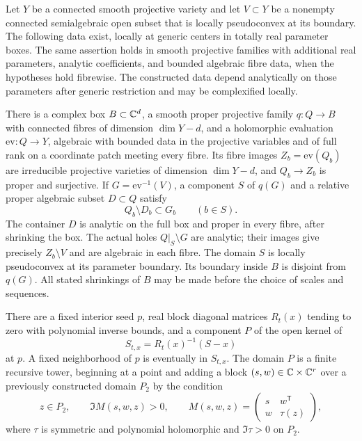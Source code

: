 \begin{theorem}\label{win:construction}
Let $Y$ be a connected smooth projective variety and let
$V\subset Y$ be a nonempty connected semialgebraic open subset that
is locally pseudoconvex at its boundary.  The following data exist,
locally at generic centers in totally real parameter boxes.  The
same assertion holds in smooth projective families with additional
real parameters, analytic coefficients, and bounded algebraic
fibre data, when the hypotheses hold fibrewise.  The constructed
data depend analytically on those parameters after generic
restriction and may be complexified locally.

There is a complex box $B\subset\mathbb C^d$, a smooth proper projective
family $q:Q\to B$ with connected fibres of dimension $\dim Y-d$,
and a holomorphic evaluation $\mathrm{ev}:Q\to Y$, algebraic with
bounded data in the projective variables and of full rank on a
coordinate patch meeting every fibre.  Its fibre images
$Z_b=\mathrm{ev}(Q_b)$ are irreducible projective varieties of
dimension $\dim Y-d$, and $Q_b\to Z_b$ is proper and surjective.
If $G=\mathrm{ev}^{-1}(V)$, a component $S$ of $q(G)$ and a
relative proper algebraic subset $D\subset Q$ satisfy
\begin{equation}\label{win:container}
               Q_b\setminus D_b\subset G_b\qquad(b\in S).
\end{equation}
The container $D$ is analytic on the full box and proper in every
fibre, after shrinking the box.  The actual holes $Q|_S\setminus G$
are analytic; their images give precisely $Z_b\setminus V$ and
are algebraic in each fibre.  The domain $S$ is locally
pseudoconvex at its parameter boundary.  Its boundary inside $B$
is disjoint from $q(G)$.  All stated shrinkings of $B$ may be
made before the choice of scales and sequences.

There are a fixed interior seed $p$, real block diagonal matrices
$R_t(x)$ tending to zero with polynomial inverse bounds, and a
component $P$ of the open kernel of
\[
                       S_{t,x}=R_t(x)^{-1}(S-x)
\]
at $p$.  A fixed neighborhood of $p$ is eventually in $S_{t,x}$.
The domain $P$ is a finite recursive tower, beginning at a point and
adding a block $(s,w)\in\mathbb C\times\mathbb C^r$ over a previously constructed
domain $P_2$ by the condition
\begin{equation}\label{win:tower}
      z\in P_2,\qquad
      \Im M(s,w,z)>0,\qquad
      M(s,w,z)=\begin{pmatrix}s&w^{\mathsf T}\\w&\tau(z)\end{pmatrix},
\end{equation}
where $\tau$ is symmetric and polynomial holomorphic and
$\Im\tau>0$ on $P_2$.


\end{theorem}
